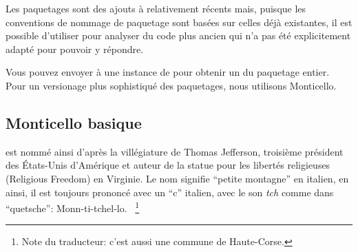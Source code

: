 \documentclass[a4paper,10pt,twoside]{book}
\begin{document}
Les paquetages sont des ajouts \`a \sq relativement r\'ecents
mais, puisque les conventions de nommage de paquetage sont bas\'ees
sur celles d\'ej\`a existantes, il est possible d'utiliser
 pour analyser du code plus ancien qui n'a pas 
\'et\'e explicitement adapt\'e pour pouvoir y r\'epondre.


Vous pouvez envoyer  \`a une instance de  
pour obtenir un \changeset du paquetage entier.
Pour un versionage plus sophistiqu\'e des paquetages, nous utilisons 
Monticello.

\subsection{Monticello basique}

 est nomm\'e ainsi d'apr\`es la vill\'egiature 
de Thomas Jefferson, troisi\`eme pr\'esident des \'Etats-Unis d'Am\'erique
et auteur de la statue pour les libert\'es religieuses (Religious Freedom) en
Virginie. Le nom signifie ``petite montagne'' en italien, en ainsi, il est
toujours prononc\'e avec un ``c'' italien, \ie avec le son \emph{tch} comme
dans ``quetsche'':
Monn-ti-tchel-lo.
~\footnote{Note du traducteur: c'est aussi une commune de Haute-Corse.}
\end{document}
